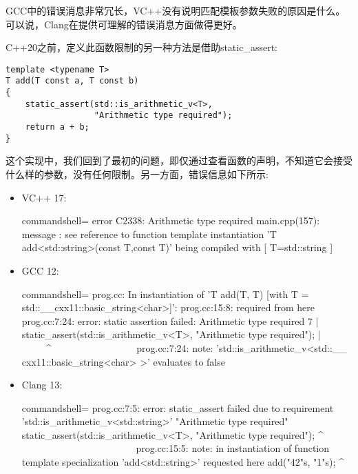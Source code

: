 GCC中的错误消息非常冗长，VC++没有说明匹配模板参数失败的原因是什么。可以说，Clang在提供可理解的错误消息方面做得更好。

C++20之前，定义此函数限制的另一种方法是借助static\_assert:

\begin{lstlisting}[style=styleCXX]
template <typename T>
T add(T const a, T const b)
{
	static_assert(std::is_arithmetic_v<T>,
				  "Arithmetic type required");
	return a + b;
}
\end{lstlisting}

这个实现中，我们回到了最初的问题，即仅通过查看函数的声明，不知道它会接受什么样的参数，没有任何限制。另一方面，错误信息如下所示:

\begin{itemize}
\item
VC++ 17:

\begin{tcblisting}{commandshell={}}
error C2338: Arithmetic type required
main.cpp(157): message : see reference to function
template instantiation 'T add<std::string>(const T,const
T)' being compiled
     with
     [
         T=std::string
     ]
\end{tcblisting}

\item
GCC 12:

\begin{tcblisting}{commandshell={}}
prog.cc: In instantiation of 'T add(T, T) [with T =
std::__cxx11::basic_string<char>]':
prog.cc:15:8: required from here
prog.cc:7:24: error: static assertion failed: Arithmetic
type required
    7 | static_assert(std::is_arithmetic_v<T>,
"Arithmetic type required");
      |                         ~~~~~^~~~~~~~~~~~~~~~~~
prog.cc:7:24: note: 'std::is_arithmetic_v<std::__
cxx11::basic_string<char> >' evaluates to false
\end{tcblisting}

\item
Clang 13:

\begin{tcblisting}{commandshell={}}
prog.cc:7:5: error: static_assert failed due to
requirement 'std::is_arithmetic_v<std::string>'
"Arithmetic type required"
     static_assert(std::is_arithmetic_v<T>, "Arithmetic
type required");
     ^ ~~~~~~~~~~~~~~~~~~~~~~~
prog.cc:15:5: note: in instantiation of function template
specialization 'add<std::string>' requested here
    add("42"s, "1"s);
    ^
\end{tcblisting}
\end{itemize}

